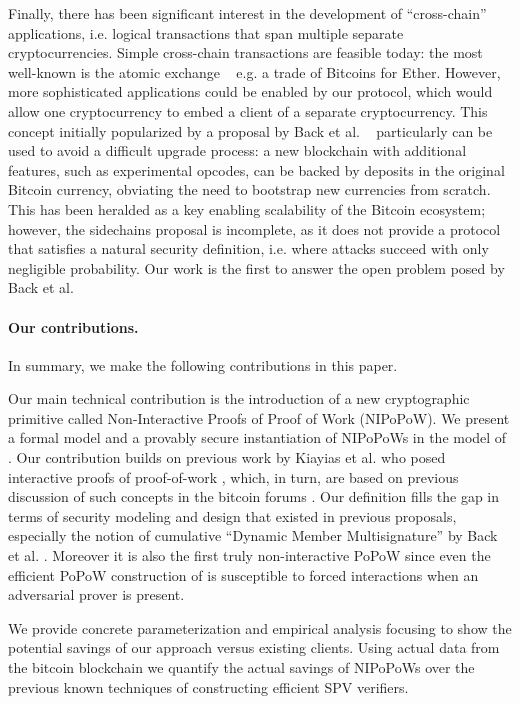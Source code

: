 Finally, there has been significant interest in the development of
``cross-chain'' applications, i.e. logical transactions that span multiple
separate cryptocurrencies. Simple cross-chain transactions are feasible today:
the most well-known is the atomic exchange ~\cite{tiernolan} e.g. a trade of
Bitcoins for Ether. However, more sophisticated applications could be enabled
by our protocol, which would allow one cryptocurrency to embed a client of a
separate cryptocurrency. This concept initially popularized by a proposal by
Back et al. ~\cite{sidechains} particularly can be used to avoid a difficult
upgrade process: a new blockchain with additional features, such as
experimental opcodes, can be backed by deposits in the original Bitcoin
currency, obviating the need to bootstrap new currencies from scratch. This
has been heralded as a key enabling scalability of the Bitcoin ecosystem;
however, the sidechains proposal is incomplete, as it does not provide a
protocol that satisfies a natural security definition, i.e. where attacks
succeed with only negligible probability. Our work is the first to answer the
open problem posed by Back et al.

\noindent
\paragraph{Our contributions.}
In summary, we make the following contributions in this paper.

Our main technical contribution is the introduction of a new cryptographic
primitive called Non-Interactive Proofs of Proof of Work (NIPoPoW). We present a
formal model and a provably secure instantiation of NIPoPoWs in the model of
\cite{backbone}. Our contribution builds on previous work by Kiayias et al. who
posed interactive proofs of proof-of-work \cite{KLS}, which, in turn, are based
on previous discussion of such concepts in the bitcoin forums \cite{highway}.
Our definition fills the gap in terms of security modeling and design that
existed in previous proposals, especially the notion of cumulative ``Dynamic
Member Multisignature'' by Back et al. \cite{sidechains}. Moreover it is also
the first truly non-interactive PoPoW since even the efficient PoPoW
construction of \cite{KLS} is susceptible to forced interactions when an
adversarial prover is present.

We provide concrete parameterization and empirical analysis focusing to show the
potential savings of our approach versus existing clients. Using actual data
from the bitcoin blockchain we quantify the actual savings of NIPoPoWs over the
previous known techniques of constructing efficient SPV verifiers.

